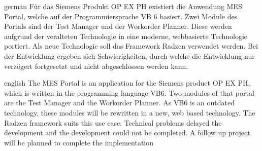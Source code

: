 \begin{abstractpage}
  \begin{myabstract}{german}
    Für das Siemens Produkt \gls{OP EX PH} existiert die Anwendung MES Portal, welche auf der Programmiersprache \gls{VB} 6 basiert. Zwei Module des Portals sind der Test Manager und der Workorder Planner. Diese werden aufgrund der veralteten Technologie in eine moderne, webbasierte Technologie portiert. Als neue Technologie soll das Framework Radzen verwendet werden. Bei der Entwicklung ergeben sich Schwierigkeiten, durch welche die Entwicklung nur verzögert fortgesetzt und nicht abgeschlossen werden kann.
  \end{myabstract}

  \begin{myabstract}{english}
    The MES Portal is an application for the Siemens product \gls{OP EX PH}, which is written in the programming language \gls{VB}6. Two modules of that portal are the Test Manager and the Workorder Planner. As \gls{VB}6 is an outdated technology, these modules will be rewritten in a new, web based technology. The Radzen framework suits this use case. Technical problems delayed the development and the development could not be completed. A follow up project will be planned to complete the implementation
  \end{myabstract}
\end{abstractpage}